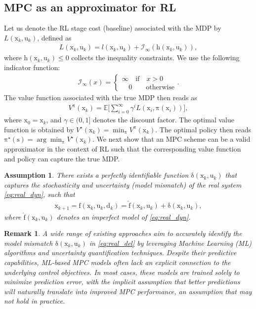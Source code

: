 \documentclass[10pt,twocolumn,twoside]{IEEEtran}
\newcommand{\vect}[1]{\ensuremath{\boldsymbol{\mathrm{#1}}}}
\newtheorem{Remark}{Remark}
\newtheorem{Assumption}{Assumption}
\begin{document}
\subsection{MPC as an approximator for RL}
Let us denote the RL stage cost (baseline) associated with the MDP by $L\left(\vect x_k,\vect u_k\right)$, defined as
\begin{align}
    L\left(\vect x_k,\vect u_k\right)=
        l\left(\vect x_k,\vect u_k\right)+\mathcal{I}_\infty\left(\vect h\left(\vect x_k,\vect u_k\right)\right),
\end{align}
where $\vect h\left(\vect x_k,\vect u_k\right)\leq 0$ collects the inequality constraints. We use the following indicator function:
\begin{align}
   \mathcal{I}_\infty\left(x\right)=\left\{\begin{matrix}
\infty\quad \text{if}\quad x>0\\\quad0\qquad\text{otherwise}
\end{matrix}\right..
\end{align}
The value function associated with the true MDP then reads as
\begin{align}\label{eq:true_V}
     V^{\vect\pi}\left(\vect x_k\right)=\mathbb{E}\Big[\sum_{i=0}^\infty\gamma^{i} L\left(\vect x_i,\vect\pi\left(\vect x_i\right)\right)\Big],
\end{align}
where $\vect x_0=\vect x_k$, and $\gamma\in(0,1]$ denotes the discount factor. The optimal value function is obtained by $V^\star\left(\vect x_k\right)=\min_{\vect\pi} V^{\vect\pi}\left(\vect x_k\right)$. The optimal policy then reads $\vect\pi^\star\left(\vect s\right)=\arg\min_{\vect\pi} V^\star\left(\vect x_k\right)$. We next show that an MPC scheme can be a valid approximator in the context of RL such that the corresponding value function and policy can capture the true MDP.
\begin{Assumption}
    There exists a perfectly identifiable function $\vect\delta\left(\vect x_k,\vect u_k\right)$ that captures the stochasticity and uncertainty (model mismatch) of the real system \eqref{eq:real_dyn}, such that
    \begin{align}\label{eq:real_del}
        \vect x_{k+1}=\vect f(\vect x_k,\vect u_k,\vect d_k)=\vect{\hat f}(\vect x_k,\vect u_k)+ \vect\delta\left(\vect x_k,\vect u_k\right),
    \end{align}
    where $\vect{\hat f}(\vect x_k,\vect u_k)$ denotes an imperfect model of \eqref{eq:real_dyn}.
\end{Assumption} 
\begin{Remark}
   A wide range of existing approaches aim to accurately identify the model mismatch $\vect\delta\left(\vect x_k,\vect u_k\right)$ in \eqref{eq:real_del} by leveraging Machine Learning (ML) algorithms and uncertainty quantification techniques. Despite their predictive capabilities, ML-based MPC models often lack an explicit connection to the underlying control objectives. In most cases, these models are trained solely to minimize prediction error, with the implicit assumption that better predictions will naturally translate into improved MPC performance, an assumption that may not hold in practice.
\end{Remark}
\end{document}
